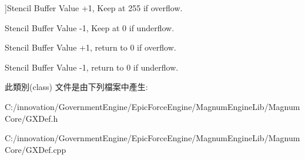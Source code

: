 \begin{Desc}
\begin{description}
{}]Stencil Buffer Value +1, Keep at 255 if overflow. \item[{\em 
Decr\hypertarget{class_i_dream_sky_1_1_g_x_stencil_op_a533e11d2d23e3d4be076ac38a613cb65aed65ba2dba8994609e0e261280a84246}{}\label{class_i_dream_sky_1_1_g_x_stencil_op_a533e11d2d23e3d4be076ac38a613cb65aed65ba2dba8994609e0e261280a84246}
}]Stencil Buffer Value -\/1, Keep at 0 if underflow. \item[{\em 
Incr\+Wrap\hypertarget{class_i_dream_sky_1_1_g_x_stencil_op_a533e11d2d23e3d4be076ac38a613cb65a4c0c3359f70fea479f2699471ae5927f}{}\label{class_i_dream_sky_1_1_g_x_stencil_op_a533e11d2d23e3d4be076ac38a613cb65a4c0c3359f70fea479f2699471ae5927f}
}]Stencil Buffer Value +1, return to 0 if overflow. \item[{\em 
Decr\+Wrap\hypertarget{class_i_dream_sky_1_1_g_x_stencil_op_a533e11d2d23e3d4be076ac38a613cb65aecd9f34d00e82c60e57be856547c2d91}{}\label{class_i_dream_sky_1_1_g_x_stencil_op_a533e11d2d23e3d4be076ac38a613cb65aecd9f34d00e82c60e57be856547c2d91}
}]Stencil Buffer Value -\/1, return to 0 if underflow. \end{description}
\end{Desc}


此類別(class) 文件是由下列檔案中產生\+:\begin{DoxyCompactItemize}
\item 
C\+:/innovation/\+Government\+Engine/\+Epic\+Force\+Engine/\+Magnum\+Engine\+Lib/\+Magnum\+Core/G\+X\+Def.\+h\item 
C\+:/innovation/\+Government\+Engine/\+Epic\+Force\+Engine/\+Magnum\+Engine\+Lib/\+Magnum\+Core/G\+X\+Def.\+cpp\end{DoxyCompactItemize}
